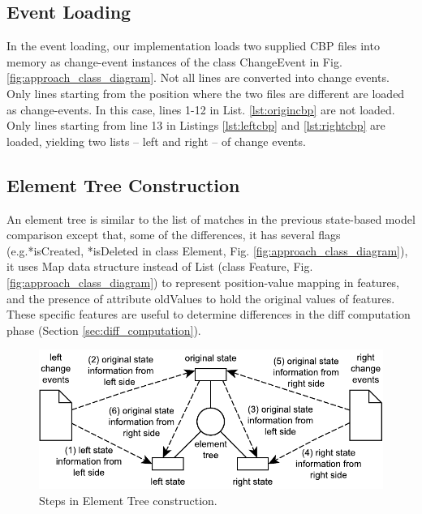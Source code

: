 \documentclass{llncs}
\begin{document}
\vspace{-20pt}
\subsection{Event Loading}
\label{sec:event_loading}
In the event loading, our implementation loads two supplied CBP files into memory as change-event instances of the class \textsf{ChangeEvent} in Fig. \ref{fig:approach_class_diagram}. Not all lines are converted into change events. Only lines starting from the position where the two files are different are loaded as change-events. In this case, lines 1-12 in List. \ref{lst:origincbp} are not loaded. Only lines starting from line 13 in Listings \ref{lst:leftcbp} and \ref{lst:rightcbp} are loaded, yielding two lists -- left and right -- of change events. 

\subsection{Element Tree Construction}
\label{sec:tree_construction}
An element tree is similar to the list of matches in the previous state-based model comparison except that, some of the differences, it has several flags (e.g.\textsf{*isCreated}, \textsf{*isDeleted} in class \textsf{Element}, Fig. \ref{fig:approach_class_diagram}), it uses Map data structure instead of List (class \textsf{Feature}, Fig. \ref{fig:approach_class_diagram}) to represent position-value mapping in features, and the presence of attribute \textsf{oldValues} to hold the original values of features. These specific features are useful to determine differences in the diff computation phase (Section \ref{sec:diff_computation}).

\vspace{-30pt}
\begin{figure}
    \includegraphics[width=\linewidth]{images/TreeConstruction}
    \caption{Steps in Element Tree construction.}
    \label{fig:tree_construction}
\end{figure}
\end{document}
